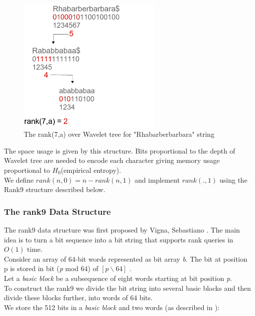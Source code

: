 \documentclass[11pt,a4paper]{report}
\begin{document}
\begin{figure}[H]
\centering
\includegraphics[width=7cm]{pictures/rank1.png}
\caption{The rank(7,a) over Wavelet tree for "Rhabarberbarbara" string }
\label{rank1}
\end{figure}

The space usage is given by this structure.
Bits proportional to the depth of  Wavelet tree are needed to encode
each character giving memory usage proportional to $H_{0}$(empirical entropy)\cite{entropy}.\\

We define \emph{$rank(n,0)= n- rank(n,1)$} and implement \emph{$rank(. , 1)$}
using the Rank9 structure described below.


\subsubsection{The rank9 Data Structure} \label{The rank9 Data Structure}


The rank9 data structure was first proposed by Vigna, Sebastiano \cite{rank9}.
The main idea is to turn a bit sequence into a bit string that supports
rank queries in $O(1)$ time.\\

Consider an array of 64-bit words represented as bit array \emph{b}.
The bit at position p is stored in bit (\emph{p} mod 64) of
$ [p \backslash 64]$ \cite{rank9}.\\ 
Let a \emph{basic block} be a subsequence of eight words 
starting at bit position \emph{p}.\\
To construct the rank9  we divide the bit string into several basic
blocks and then divide these blocks further, into words of 64 bits.\\
We store the 512 bits in a \emph{basic block} and two words (as described in \cite{rank9}):
\end{document}

